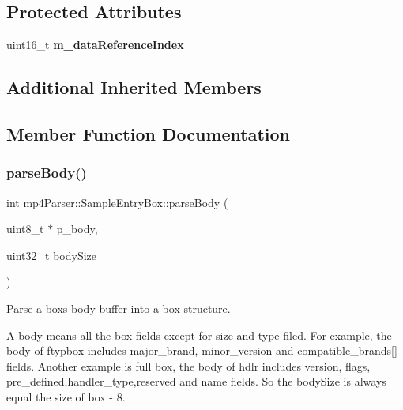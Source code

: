 \subsection*{Protected Attributes}
\begin{DoxyCompactItemize}
\item 
\mbox{\label{classmp4_parser_1_1_sample_entry_box_a5ea3cc1f78bf6075cd5d246e330bd432}} 
uint16\+\_\+t {\bfseries m\+\_\+data\+Reference\+Index}
\end{DoxyCompactItemize}
\subsection*{Additional Inherited Members}


\subsection{Member Function Documentation}
\mbox{\label{classmp4_parser_1_1_sample_entry_box_a8ff77bc115eb18deee12619ebfc0eaa6}} 
\subsubsection{\texorpdfstring{parseBody()}{parseBody()}}
{\footnotesize\ttfamily int mp4\+Parser\+::\+Sample\+Entry\+Box\+::parse\+Body (\begin{DoxyParamCaption}\item[{uint8\+\_\+t $\ast$}]{p\+\_\+body,  }\item[{uint32\+\_\+t}]{body\+Size }\end{DoxyParamCaption})\hspace{0.3cm}{\ttfamily [virtual]}}



Parse a box\textquotesingle{}s body buffer into a box structure. 

A body means all the box fields except for size and type filed. For example, the body of ftypbox includes major\+\_\+brand, minor\+\_\+version and compatible\+\_\+brands\mbox{[}\mbox{]} fields. Another example is full box, the body of hdlr includes version, flags, pre\+\_\+defined,handler\+\_\+type,reserved and name fields. So the body\+Size is always equal the size of box -\/ 8. 

